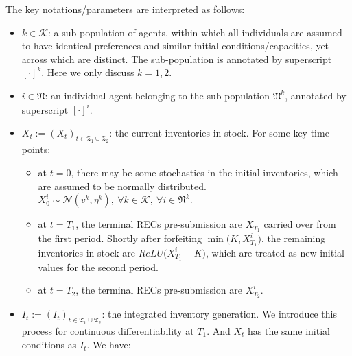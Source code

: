 \documentclass[a4paper,10pt]{article}
\newcommand{\1}{\mathbf{1}}
\begin{document}
The key notations/parameters are interpreted as follows:

\begin{itemize}
\item
  \(k \in \mathcal{K}\): a sub-population of agents, within which all
  individuals are assumed to have identical preferences and similar
  initial conditions/capacities, yet across which are distinct. The
  sub-population is annotated by superscript \([\cdot]^{k}\). Here we
  only discuss \(k=1,2\).
\item
  \(i \in \mathfrak{N}\): an individual agent belonging to the
  sub-population \(\mathfrak{N}^k\), annotated by superscript
  \([\cdot]^{i}\).
\item
  \(X_t := (X_t)_{t\in\mathfrak{T_1} \cup \mathfrak{T_2}}\): the current
  inventories in stock. For some key time points:

  \begin{itemize}
  \tightlist
  \item
    at \(t=0\), there may be some stochastics in the initial
    inventories, which are assumed to be normally distributed.
    \(X_0^{i} \sim \mathcal{N}(v^k, \eta^k) ,~ \forall k \in \mathcal{K},~\forall i \in \mathfrak{N}^k\).
  \item
    at \(t=T_1\), the terminal RECs pre-submission are \(X_{T_1}\)
    carried over from the first period. Shortly after forfeiting
    \(\min\Big(K,X^i_{T_1}\Big)\), the remaining inventories in stock
    are \(ReLU\Big(X^i_{T_1}-K\Big)\), which are treated as new initial
    values for the second period.
  \item
    at \(t=T_2\), the terminal RECs pre-submission are \(X^i_{T_2}\).
  \end{itemize}
\item
  \(I_t := (I_t)_{t\in\mathfrak{T_1} \cup \mathfrak{T_2}}\): the
  integrated inventory generation. We introduce this process for
  continuous differentiability at \(T_1\). And \(X_t\) has the same
  initial conditions as \(I_t\). We have:


\end{itemize}
\end{document}
